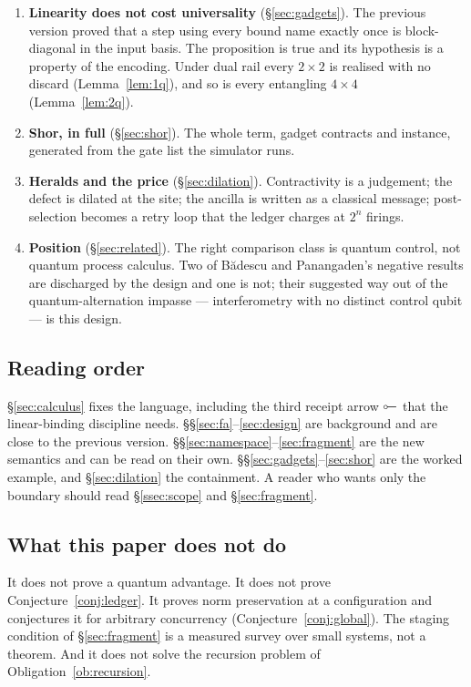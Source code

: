 \documentclass[11pt,a4paper]{article}
\theoremstyle{plain}
\theoremstyle{definition}
\theoremstyle{remark}
\newcommand{\lolli}{\mathrel{\reflectbox{$\multimap$}}}
\begin{document}
\begin{enumerate}[leftmargin=1.4em,itemsep=3pt]
\item \textbf{Linearity does not cost universality} (\S\ref{sec:gadgets}). The
previous version proved that a step using every bound name exactly once is
block-diagonal in the input basis. The proposition is true and its hypothesis is
a property of the encoding. Under dual rail every $2\times 2$ is realised with
no discard (Lemma~\ref{lem:1q}), and so is every entangling $4\times4$
(Lemma~\ref{lem:2q}).

\item \textbf{Shor, in full} (\S\ref{sec:shor}). The whole term, gadget
contracts and instance, generated from the gate list the simulator runs.

\item \textbf{Heralds and the price} (\S\ref{sec:dilation}). Contractivity is a
judgement; the defect is dilated at the site; the ancilla is written as a
classical message; post-selection becomes a retry loop that the ledger charges
at $2^n$ firings.

\item \textbf{Position} (\S\ref{sec:related}). The right comparison class is
quantum control, not quantum process calculus. Two of Bădescu and Panangaden's
negative results \cite{BadescuPanangaden} are discharged by the design and one
is not; their suggested way out of the quantum-alternation impasse ---
interferometry with no distinct control qubit --- is this design.
\end{enumerate}

\subsection{Reading order}

\S\ref{sec:calculus} fixes the language, including the third receipt arrow
$\lolli$ that the linear-binding discipline needs.
\S\S\ref{sec:fa}--\ref{sec:design} are background and are close to the
previous version. \S\S\ref{sec:namespace}--\ref{sec:fragment} are the new
semantics and can be read on their own.
\S\S\ref{sec:gadgets}--\ref{sec:shor} are the worked example, and
\S\ref{sec:dilation} the containment. A reader who wants only the boundary
should read \S\ref{ssec:scope} and \S\ref{sec:fragment}.

\subsection{What this paper does not do}

It does not prove a quantum advantage. It does not prove
Conjecture~\ref{conj:ledger}. It proves norm preservation at a configuration and
conjectures it for arbitrary concurrency (Conjecture~\ref{conj:global}). The
staging condition of \S\ref{sec:fragment} is a measured survey over small
systems, not a theorem. And it does not solve the recursion problem of
Obligation~\ref{ob:recursion}.
\end{document}
